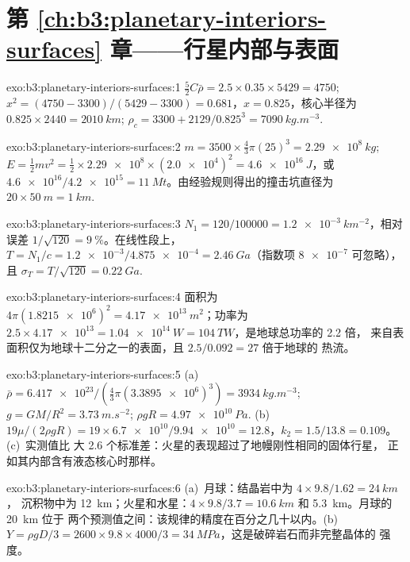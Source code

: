 \section*{第 \ref{ch:b3:planetary-interiors-surfaces} 章——行星内部与表面}

\begin{solution}{exo:b3:planetary-interiors-surfaces:1}
$\tfrac52C\bar\rho = 2.5\times0.35\times5429 = 4750$; $x^2 = (4750 -
3300)/(5429 - 3300) = 0.681$，$x = 0.825$，核心半径为 $0.825\times2440 =
\qty{2010}{km}$; $\rho_c = 3300 + 2129/0.825^3 = \qty{7090}{kg.m^{-3}}$.
\end{solution}

\begin{solution}{exo:b3:planetary-interiors-surfaces:2}
$m = 3500\times\tfrac43\pi(25)^3 = \qty{2.29e8}{kg}$; $E = \tfrac12 m v^2 =
\tfrac12\times\num{2.29e8}\times(\num{2.0e4})^2 = \qty{4.6e16}{J}$，或
$\num{4.6e16}/\num{4.2e15} = \qty{11}{Mt}$。由经验规则得出的撞击坑直径为
$20\times\qty{50}{m} = \qty{1}{km}$.
\end{solution}

\begin{solution}{exo:b3:planetary-interiors-surfaces:3}
$N_1 = 120/\num{100000} = \qty{1.2e-3}{km^{-2}}$，相对误差 $1/\sqrt{120}
= \qty{9}{\percent}$。在线性段上，$T = N_1/c = \num{1.2e-3}/\num{4.875e-4}
= \qty{2.46}{Ga}$（指数项 $\num{8e-7}$ 可忽略），且
$\sigma_T = T/\sqrt{120} = \qty{0.22}{Ga}$.
\end{solution}

\begin{solution}{exo:b3:planetary-interiors-surfaces:4}
面积为 $4\pi(\num{1.8215e6})^2 = \qty{4.17e13}{m^2}$；功率为 $2.5\times
\num{4.17e13} = \qty{1.04e14}{W} = \qty{104}{TW}$，是地球总功率的 2.2 倍，
来自表面积仅为地球十二分之一的表面，且 $2.5/0.092 = 27$ 倍于地球的
热流。
\end{solution}

\begin{solution}{exo:b3:planetary-interiors-surfaces:5}
(a)~$\bar\rho = \num{6.417e23}/(\tfrac43\pi(\num{3.3895e6})^3) =
\qty{3934}{kg.m^{-3}}$; $g = GM/R^2 = \qty{3.73}{m.s^{-2}}$; $\rho gR =
\qty{4.97e10}{Pa}$. (b)~$19\mu/(2\rho gR) = 19\times\num{6.7e10}/\num{9.94e10}
= 12.8$，$k_2 = 1.5/13.8 = 0.109$。(c)~实测值比
大 2.6 个标准差：火星的表现超过了地幔刚性相同的固体行星，
正如其内部含有液态核心时那样。
\end{solution}

\begin{solution}{exo:b3:planetary-interiors-surfaces:6}
(a)~月球：结晶岩中为 $4\times9.8/1.62 = \qty{24}{km}$，
沉积物中为 \qty{12}{km}；火星和水星：$4\times9.8/3.7 =
\qty{10.6}{km}$ 和 \qty{5.3}{km}。月球的 \qty{20}{km} 位于
两个预测值之间：该规律的精度在百分之几十以内。(b)~$Y =
\rho gD/3 = 2600\times9.8\times4000/3 = \qty{34}{MPa}$，这是破碎岩石而非完整晶体的
强度。
\end{solution}

